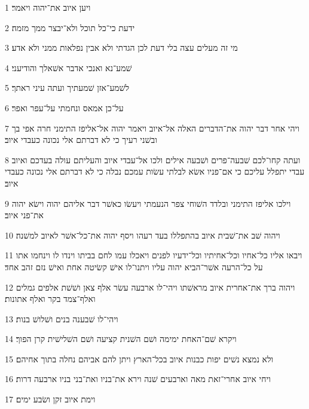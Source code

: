 \par 1 ויען איוב את־יהוה ויאמר׃
\par 2 ידעת כי־כל תוכל ולא־יבצר ממך מזמה׃
\par 3 מי זה מעלים עצה בלי דעת לכן הגדתי ולא אבין נפלאות ממני ולא אדע׃
\par 4 שׁמע־נא ואנכי אדבר אשׁאלך והודיעני׃
\par 5 לשׁמע־אזן שׁמעתיך ועתה עיני ראתך׃
\par 6 על־כן אמאס ונחמתי על־עפר ואפר׃
\par 7 ויהי אחר דבר יהוה את־הדברים האלה אל־איוב ויאמר יהוה אל־אליפז התימני חרה אפי בך ובשׁני רעיך כי לא דברתם אלי נכונה כעבדי איוב׃
\par 8 ועתה קחו־לכם שׁבעה־פרים ושׁבעה אילים ולכו אל־עבדי איוב והעליתם עולה בעדכם ואיוב עבדי יתפלל עליכם כי אם־פניו אשׂא לבלתי עשׂות עמכם נבלה כי לא דברתם אלי נכונה כעבדי איוב׃
\par 9 וילכו אליפז התימני ובלדד השׁוחי צפר הנעמתי ויעשׂו כאשׁר דבר אליהם יהוה וישׂא יהוה את־פני איוב׃
\par 10 ויהוה שׁב את־שׁבית איוב בהתפללו בעד רעהו ויסף יהוה את־כל־אשׁר לאיוב למשׁנה׃
\par 11 ויבאו אליו כל־אחיו וכל־אחיתיו וכל־ידעיו לפנים ויאכלו עמו לחם בביתו וינדו לו וינחמו אתו על כל־הרעה אשׁר־הביא יהוה עליו ויתנו־לו אישׁ קשׂיטה אחת ואישׁ נזם זהב אחד׃
\par 12 ויהוה ברך את־אחרית איוב מראשׁתו ויהי־לו ארבעה עשׂר אלף צאן ושׁשׁת אלפים גמלים ואלף־צמד בקר ואלף אתונות׃
\par 13 ויהי־לו שׁבענה בנים ושׁלושׁ בנות׃
\par 14 ויקרא שׁם־האחת ימימה ושׁם השׁנית קציעה ושׁם השׁלישׁית קרן הפוך׃
\par 15 ולא נמצא נשׁים יפות כבנות איוב בכל־הארץ ויתן להם אביהם נחלה בתוך אחיהם׃
\par 16 ויחי איוב אחרי־זאת מאה וארבעים שׁנה וירא את־בניו ואת־בני בניו ארבעה דרות׃
\par 17 וימת איוב זקן ושׂבע ימים׃


